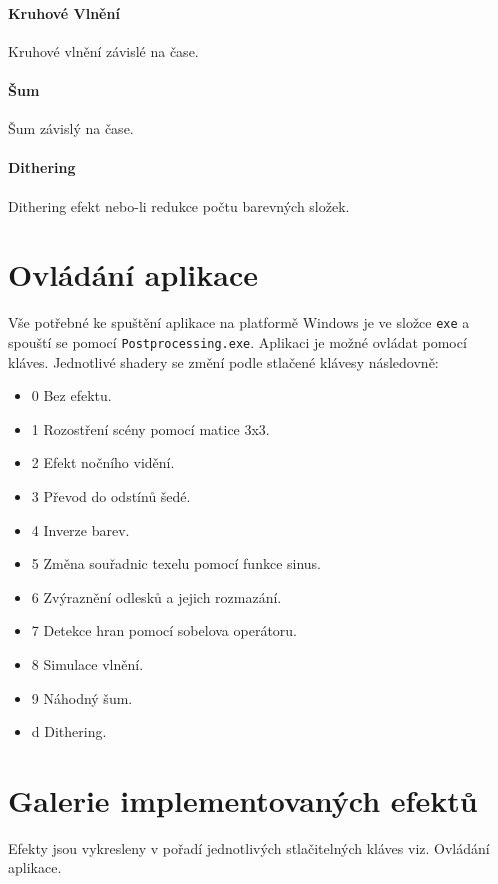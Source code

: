 \documentclass[12pt,a4paper,titlepage,final]{report}
\begin{document}
\paragraph{Kruhové Vlnění} Kruhové vlnění závislé na čase.

\paragraph{Šum} Šum závislý na čase.

\paragraph{Dithering} Dithering efekt nebo-li redukce počtu barevných složek.

\section{Ovládání aplikace}

Vše potřebné ke spuštění aplikace na platformě Windows je ve složce \verb|exe| a spouští se pomocí \verb|Postprocessing.exe|. Aplikaci je možné ovládat pomocí kláves. Jednotlivé shadery se změní podle stlačené klávesy následovně:

\begin{itemize}
\item 0	Bez efektu.
\item 1	Rozostření scény pomocí matice 3x3.
\item 2	Efekt nočního vidění.
\item 3	Převod do odstínů šedé.
\item 4	Inverze barev.
\item 5	Změna souřadnic texelu pomocí funkce sinus.
\item 6	Zvýraznění odlesků a jejich rozmazání.
\item 7	Detekce hran pomocí sobelova operátoru.
\item 8	Simulace vlnění.
\item 9	Náhodný šum.
\item d Dithering.
\end{itemize}


\section{Galerie implementovaných efektů}

Efekty jsou vykresleny v pořadí jednotlivých stlačitelných kláves viz. Ovládání aplikace.
\end{document}
